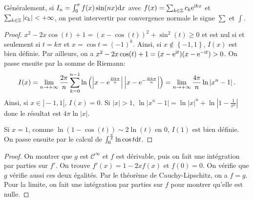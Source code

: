 \documentclass[12pt]{article}
\begin{document}
\begin{remark}
    Généralement, si $I_n=\int_{0}^{\pi}f(x)\sin(nx)\mathrm{d} x$ avec $f(x)=\sum_{k\in\mathbb{Z}}c_k\mathrm{e}^{\mathrm{i} kx}$ et $\sum_{k\in\mathbb{Z}}\left\lvert c_k\right\rvert<+\infty$, on peut intervertir par convergence normale le signe $\sum$ et $\int$.
\end{remark}

\begin{proof}
    $x^{2}-2x\cos(t)+1=(x-\cos(t))^{2}+\sin^{2}(t)\geqslant0$ et est nul si et seulement si $t=k\pi$ et $x=\cos t=(-1)^{k}$. Ainsi, si $x\not\in\left\lbrace-1,1\right\rbrace$, $I(x)$ est bien définie. Par ailleurs, on a $x^{2}-2x\cos(t)+1=(x-\mathrm{e}^{\mathrm{i} t})(x-\mathrm{e}^{-\mathrm{i} t})>0$. On passe ensuite par la somme de Riemann:
    \begin{equation*}
        I(x)=\lim\limits_{n\to+\infty}\frac{2\pi}{n}\sum_{k=0}^{n-1}\ln\left(\left\lvert x-\mathrm{e}^{\frac{2\mathrm{i} k\pi}{n}}\right\rvert\left\lvert x-\mathrm{e}^{-\frac{2\mathrm{i} k\pi}{n}}\right\rvert\right)=\lim\limits_{n\to+\infty}\frac{4\pi}{n}\ln\left\lvert x^{n}-1\right\rvert.
    \end{equation*}
    Ainsi, si $x\in]-1,1[$, $I(x)=0$. Si $\left\lvert x\right\rvert>1$, $\ln\left\lvert x^{n}-1\right\rvert=\ln\left\lvert x\right\rvert^{n}+\ln\left\lvert 1-\frac{1}{x^{n}}\right\rvert$ donc le résultat est $4\pi\ln\left\lvert x\right\rvert$.

    Si $x=1$, comme $\ln(1-\cos(t))\sim2\ln(t)$ en 0, $I(1)$ est bien définie. On passe ensuite par le calcul de $\int_{0}^{\frac{\pi}{2}}\ln\cos t\mathrm{d} t$.
\end{proof}

\begin{proof}
    On montrer que $g$ est $\mathcal{C}^{\infty}$ et $f$ est dérivable, puis on fait une intégration par parties sur $f'$. On trouve $f'(x)=1-2xf(x)$ et $f(0)=0$. On vérifie que $g$ vérifie aussi ces deux égalités. Par le théorème de Cauchy-Lipschitz, on a $f=g$. Pour la limite, on fait une intégration par parties sur $f$ pour montrer qu'elle est nulle.
\end{proof}
\end{document}
